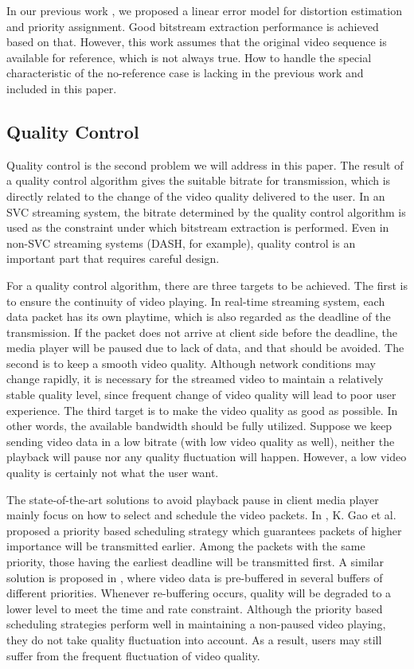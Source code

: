 \documentclass[journal]{IEEEtran}
\begin{document}
In our previous work \cite{Zhang12}, we proposed a linear error model for distortion estimation and priority assignment. Good bitstream extraction performance is achieved based on that. However, this work assumes that the original video sequence is available for reference, which is not always true. How to handle the special characteristic of the no-reference case is lacking in the previous work and included in this paper.

\subsection{Quality Control}
\label{subsec:analysis-control}

Quality control is the second problem we will address in this paper. The result of a quality control algorithm gives the suitable bitrate for transmission, which is directly related to the change of the video quality delivered to the user. In an SVC streaming system, the bitrate determined by the quality control algorithm is used as the constraint under which bitstream extraction is performed. Even in non-SVC streaming systems (DASH, for example), quality control is an important part that requires careful design.

For a quality control algorithm, there are three targets to be achieved. The first is to ensure the continuity of video playing. In real-time streaming system, each data packet has its own playtime, which is also regarded as the deadline of the transmission. If the packet does not arrive at client side before the deadline, the media player will be paused due to lack of data, and that should be avoided. The second is to keep a smooth video quality. Although network conditions may change rapidly, it is necessary for the streamed video to maintain a relatively stable quality level, since frequent change of video quality will lead to poor user experience. The third target is to make the video quality as good as possible. In other words, the available bandwidth should be fully utilized. Suppose we keep sending video data in a low bitrate (with low video quality as well), neither the playback will pause nor any quality fluctuation will happen. However, a low video quality is certainly not what the user want.

The state-of-the-art solutions to avoid playback pause in client media player mainly focus on how to select and schedule the video packets. In \cite{Gao06}, K. Gao et al. proposed a priority based scheduling strategy which guarantees packets of higher importance will be transmitted earlier. Among the packets with the same priority, those having the earliest deadline will be transmitted first. A similar solution is proposed in \cite{Schierl10}, where video data is pre-buffered in several buffers of different priorities. Whenever re-buffering occurs, quality will be degraded to a lower level to meet the time and rate constraint. Although the priority based scheduling strategies perform well in maintaining a non-paused video playing, they do not take quality fluctuation into account. As a result, users may still suffer from the frequent fluctuation of video quality.
\end{document}
